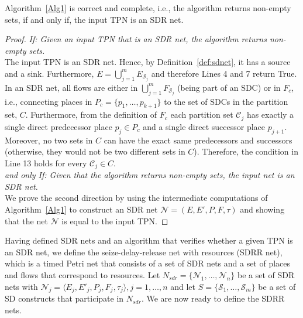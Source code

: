 \begin{myprop} \label{prop:corrAlg1}
	Algorithm~\ref{Alg1} is correct and complete, 
	i.e., the algorithm returns non-empty sets, if and only if, the input TPN
	is an SDR net. 
\end{myprop}
\begin{proof} \noindent \emph{If: Given an input TPN that is an SDR net, the algorithm returns non-empty sets.}\\
	The input TPN is an SDR net. Hence, by Definition~\ref{def:sdnet}, it has a source and a sink. Furthermore, $E = \bigcup_{j=1}^m E_{\mathcal{S}_j}$
	and therefore Lines 4 and 7 return True. 
	In an SDR net, all flows are either 
	in $\bigcup_{j=1}^m F_{\mathcal{S}_j}$ (being part of an SDC) 
	or in $F_c$, i.e., connecting places in $P_c = \{p_1,\ldots, p_{k+1}\}$
	to the set of SDCs in the partition set, $C$. Furthermore, from the definition of $F_c$ 
	each partition set $\mathcal{C}_j$ has exactly a single direct predecessor place $p_j \in P_c$
	and a single direct successor place $p_{j+1}$. Moreover, no two 
	sets in $C$ can have the exact same predecessors and successors (otherwise, they would 
	not be two different sets in $C$). Therefore, the condition in Line 13
	holds for every $\mathcal{C}_j \in C$.\\	
		
	\noindent \emph{and only If: 
	Given that the algorithm returns non-empty sets, the input net is an SDR net.}\\
	We prove the second direction by using the intermediate 
	computations
	of Algorithm~\ref{Alg1} to construct an SDR net $\mathcal{N} = (E, E',P, F, \tau)$
	and showing that the net $\mathcal{N}$ is equal to the input TPN. 
	
	
		

	
\end{proof}


Having defined SDR nets and an algorithm that verifies whether 
a given TPN is an SDR net, we
define the seize-delay-release net with resources (SDRR net),
which is a timed Petri net that consists of a set of SDR nets and a set of places
and flows that correspond to resources. Let $N_{sdr} = \{\mathcal{N}_1,\ldots,\mathcal{N}_n\}$ be a set of 
SDR nets with $\mathcal{N}_j = \langle E_j, E'_j , P_j , F_j, \tau_j\rangle, j = 1, \ldots, n$ and
let $S = \{\mathcal{S}_1,\ldots,\mathcal{S}_m\}$ be a set of SD constructs
that participate in $N_{sdr}$. We are now ready to define the SDRR nets. 

